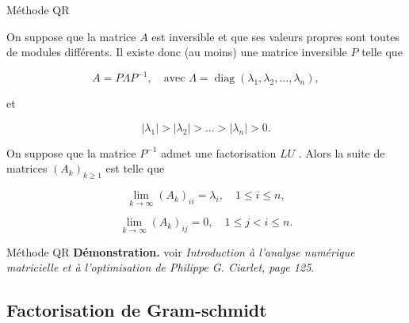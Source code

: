 \documentclass[french, 10pt]{beamer}
\theoremstyle{definition}
\begin{document}
\begin{frame}{Méthode QR}
	\begin{theorem}
		On suppose que la matrice $A$ est inversible et que ses valeurs propres sont toutes de modules différents. Il existe donc (au moins) une matrice inversible $P$ telle que  
		
		\[
		A = P \Lambda P^{-1}, \quad \text{avec } \Lambda = \operatorname{diag}(\lambda_1, \lambda_2, \dots, \lambda_n),
		\]
		
		et  
		
		\[
		|\lambda_1| > |\lambda_2| > \dots > |\lambda_n| > 0.
		\]
		
		On suppose que la matrice $P^{-1}$ admet une factorisation $LU$ .  
		Alors la suite de matrices $\left(A_k\right)_{k \geqslant 1}$ est telle que  
		
		\[
		\lim _{k \rightarrow \infty} (A_k)_{ii} = \lambda_i, \quad 1 \leqslant i \leqslant n,
		\]
		
		\[
		\lim _{k \rightarrow \infty} (A_k)_{ij} = 0, \quad 1 \leqslant j < i \leqslant n.
		\]
		
	\end{theorem}
	
\end{frame}
\begin{frame}{Méthode QR}
	\textbf{Démonstration.} voir \textit{Introduction à l'analyse numérique matricielle et à l'optimisation de Philippe G. Ciarlet, page 125}.
\end{frame}
\subsection*{Factorisation de Gram-schmidt}
\end{document}
